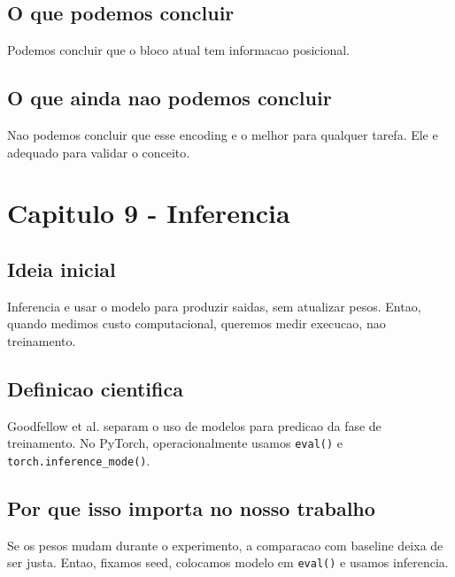 \subsection{O que podemos concluir}



Podemos concluir que o bloco atual tem informacao posicional.



\subsection{O que ainda nao podemos concluir}




Nao podemos concluir que esse encoding e o melhor para qualquer tarefa. Ele e adequado para validar o conceito.



\section{Capitulo 9 - Inferencia}



\subsection{Ideia inicial}




Inferencia e usar o modelo para produzir saidas, sem atualizar pesos. Entao, quando medimos custo computacional, queremos medir execucao, nao treinamento.



\subsection{Definicao cientifica}




Goodfellow et al. separam o uso de modelos para predicao da fase de treinamento. No PyTorch, operacionalmente usamos \texttt{eval()} e \texttt{torch.\allowbreak{}inference\_\allowbreak{}mode()}.



\subsection{Por que isso importa no nosso trabalho}




Se os pesos mudam durante o experimento, a comparacao com baseline deixa de ser justa. Entao, fixamos seed, colocamos modelo em \texttt{eval()} e usamos inferencia.



